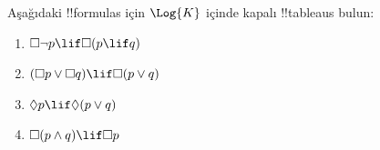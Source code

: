 \documentclass[../../../include/open-logic-section]{subfiles}
\begin{document}
\begin{prob}
  Aşağıdaki !!{formula}s için $\Log{K}$ içinde kapalı !!{tableau}s bulun:
  \begin{enumerate}
    \item $\Box \lnot p \lif \Box(p \lif q)$
    \item $(\Box p \lor \Box q) \lif \Box(p \lor q)$
    \item $\Diamond p \lif \Diamond(p \lor q)$
    \item $\Box(p \land q) \lif \Box p$
  \end{enumerate}
\end{prob}
\end{document}

